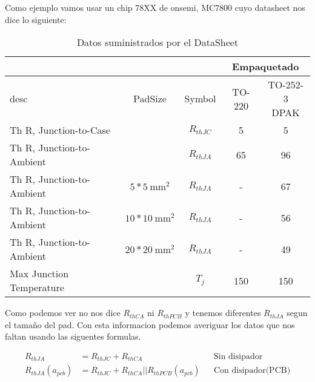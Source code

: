 Como ejemplo vamos usar un chip 78XX de onsemi, MC7800 cuyo datasheet nos dice
lo siguiente:
\begin{table}[H]
    \centering
    \renewcommand\theadfont{\bfseries}
    \setlength{\tabcolsep}{10pt}
    \renewcommand{\arraystretch}{1.5}
    \begin{tabular}{|l|c|c|c|c|}
        \hline
                                  &                          &            & \multicolumn{2}{|c|}{Empaquetado}                      \\ \hline
        desc                      & PadSize                  & Symbol     & TO-220                            & \makecell{TO-252-3 \\ DPAK } \\ \hline
        Th R, Junction-to-Case    &                          & $R_{thJC}$ & 5                                 & 5                  \\ \hline
        Th R, Junction-to-Ambient &                          & $R_{thJA}$ & 65                                & 96                 \\ \hline
        Th R, Junction-to-Ambient & $5*\SI{5}{\square\mm}$   & $R_{thJA}$ & -                                 & 67                 \\ \hline
        Th R, Junction-to-Ambient & $10*\SI{10}{\square\mm}$ & $R_{thJA}$ & -                                 & 56                 \\ \hline
        Th R, Junction-to-Ambient & $20*\SI{20}{\square\mm}$ & $R_{thJA}$ & -                                 & 49                 \\ \hline
        Max Junction Temperature  &                          & $T_j$      & 150                               & 150                \\
        \hline
    \end{tabular}
    \caption{Datos suministrados por el DataSheet}
    \label{tab:MC7800_ds_thermal_data}
\end{table}

Como podemos ver no nos dice $R_{thCA}$ ni $R_{thPCB}$ y tenemos diferentes $R_{thJA}$
segun el tamaño del pad. Con esta informacion podemos averiguar los datos que nos faltan
usando las siguentes formulas.


\begin{subequations}
    \label{eq:basicRth}
    \begin{align}
        \label{eq:RthSinDisipador} R_{thJA}&=R_{thJC}+R_{thCA} &&\text{Sin disipador } \\
        \label{eq:RthConDisipador} R_{thJA}(a_{pcb})&=R_{thJC}+R_{thCA}||R_{thPCB}(a_{pcb}) &&\text{Con disipador(PCB)} 
    \end{align}
\end{subequations}

